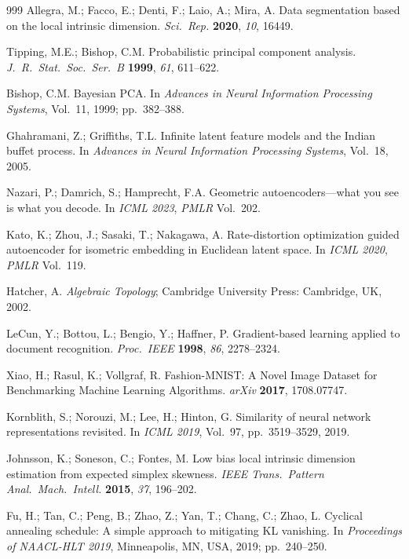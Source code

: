 \documentclass[make,article,submit,pdftex,moreauthors]{Definitions/mdpi}
\begin{document}
\begin{thebibliography}{999}
Allegra, M.; Facco, E.; Denti, F.; Laio, A.; Mira, A.
Data segmentation based on the local intrinsic dimension.
\textit{Sci.\ Rep.} \textbf{2020}, \textit{10}, 16449.

Tipping, M.E.; Bishop, C.M.
Probabilistic principal component analysis.
\textit{J.\ R.\ Stat.\ Soc.\ Ser.\ B} \textbf{1999}, \textit{61}, 611--622.

Bishop, C.M.
Bayesian PCA.
In \textit{Advances in Neural Information Processing Systems}, Vol.~11,
1999; pp.~382--388.

Ghahramani, Z.; Griffiths, T.L.
Infinite latent feature models and the Indian buffet process.
In \textit{Advances in Neural Information Processing Systems}, Vol.~18,
2005.

Nazari, P.; Damrich, S.; Hamprecht, F.A.
Geometric autoencoders---what you see is what you decode.
In \textit{ICML 2023}, \textit{PMLR} Vol.~202.

Kato, K.; Zhou, J.; Sasaki, T.; Nakagawa, A.
Rate-distortion optimization guided autoencoder for isometric embedding in
Euclidean latent space.
In \textit{ICML 2020}, \textit{PMLR} Vol.~119.

Hatcher, A.
\textit{Algebraic Topology};
Cambridge University Press: Cambridge, UK, 2002.

LeCun, Y.; Bottou, L.; Bengio, Y.; Haffner, P.
Gradient-based learning applied to document recognition.
\textit{Proc.\ IEEE} \textbf{1998}, \textit{86}, 2278--2324.

Xiao, H.; Rasul, K.; Vollgraf, R.
Fashion-{MNIST}: A Novel Image Dataset for Benchmarking Machine Learning
Algorithms.
\textit{arXiv} \textbf{2017}, 1708.07747.

Kornblith, S.; Norouzi, M.; Lee, H.; Hinton, G.
Similarity of neural network representations revisited.
In \textit{ICML 2019}, Vol.~97, pp.~3519--3529, 2019.

Johnsson, K.; Soneson, C.; Fontes, M.
Low bias local intrinsic dimension estimation from expected simplex
skewness.
\textit{IEEE Trans.\ Pattern Anal.\ Mach.\ Intell.} \textbf{2015},
\textit{37}, 196--202.

Fu, H.; Tan, C.; Peng, B.; Zhao, Z.; Yan, T.; Chang, C.; Zhao, L.
Cyclical annealing schedule: A simple approach to mitigating {KL} vanishing.
In \textit{Proceedings of NAACL-HLT 2019}, Minneapolis, MN, USA, 2019;
pp.~240--250.


\end{thebibliography}
\end{document}
